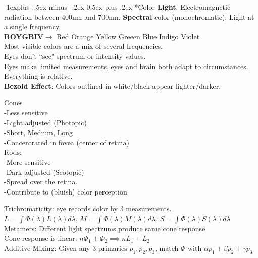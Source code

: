 \documentclass[3pt,landscape]{article}
\makeatletter
\renewcommand{\subsection}{\@startsection{subsection}{2}{0mm}%
                            {-1explus -.5ex minus -.2ex}%
                            {0.5ex plus .2ex}%
                            {\normalfont\normalsize\bfseries}}
\makeatother
\begin{document}
\begin{multicols}{3}
\subsection*{Color}
{\bf Light}: Electromagnetic radiation between 400nm and 700nm.
{\bf Spectral} color (monochromatic): Light at a single frequency.\\
{\bf ROYGBIV}\(\rightarrow\) Red Orange Yellow Greeen Blue Indigo Violet\\
Most visible colors are a mix of several frequencies.\\
Eyes don't ``see" spectrum or intensity values.\\
Eyes make limited measurements, eyes and brain both adapt to circumstances. Everything is relative.\\
{\bf Bezold Effect}: Colors outlined in white/black appear lighter/darker.
\begin{multicols}{2}
\center
Cones\\
-Less sensitive\\
-Light adjusted (Photopic)\\
-Short, Medium, Long\\
-Concentrated in fovea (center of retina)\\
\columnbreak
Rods:\\
-More sensitive\\
-Dark adjusted (Scotopic)\\
-Spread over the retina.\\
-Contribute to (bluish) color perception
\end{multicols}
Trichromaticity: eye records color by 3 measurements.\\
\(L = \int\Phi(\lambda)L(\lambda)d\lambda\), 
\(M = \int\Phi(\lambda)M(\lambda)d\lambda\), 
\(S = \int\Phi(\lambda)S(\lambda)d\lambda\)\\
Metamers: Different light spectrums produce same cone response\\
Cone response is linear: \(n\Phi_1+\Phi_2 \implies nL_1+L_2\)\\
Additive Mixing: Given any 3 primaries \(p_1,p_2,p_3\), match \(\Phi\) with \(\alpha p_1 + \beta p_2 + \gamma p_3\)\\

\end{multicols}
\end{document}
